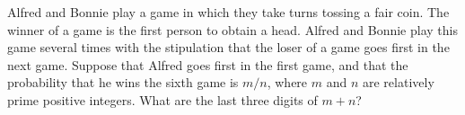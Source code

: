 Alfred and Bonnie play a game in which they take turns tossing a fair coin.  The winner of a game is the first person to obtain a head.  Alfred and Bonnie play this game several times with the stipulation that the loser of a game goes first in the next game.  Suppose that Alfred goes first in the first game, and that the probability that he wins the sixth game is $m/n$, where $m$ and $n$ are relatively prime positive integers.  What are the last three digits of $m + n$?